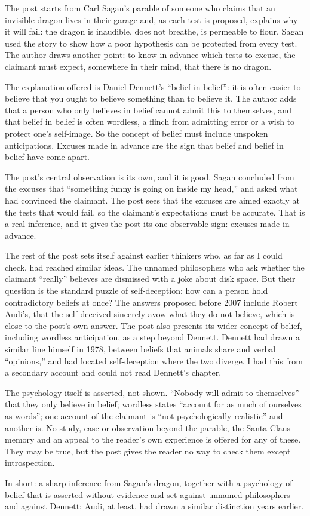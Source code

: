 \begin{afterword}
\summaryhead

The post starts from Carl Sagan's parable of someone who claims that an invisible dragon lives in their garage and, as each test is proposed, explains why it will fail: the dragon is inaudible, does not breathe, is permeable to flour. Sagan used the story to show how a poor hypothesis can be protected from every test. The author draws another point: to know in advance which tests to excuse, the claimant must expect, somewhere in their mind, that there is no dragon.

The explanation offered is Daniel Dennett's ``belief in belief'': it is often easier to believe that you ought to believe something than to believe it. The author adds that a person who only believes in belief cannot admit this to themselves, and that belief in belief is often wordless, a flinch from admitting error or a wish to protect one's self-image. So the concept of belief must include unspoken anticipations. Excuses made in advance are the sign that belief and belief in belief have come apart.

\responsehead

The post's central observation is its own, and it is good. Sagan concluded from the excuses that ``something funny is going on inside my head,'' and asked what had convinced the claimant. The post sees that the excuses are aimed exactly at the tests that would fail, so the claimant's expectations must be accurate. That is a real inference, and it gives the post its one observable sign: excuses made in advance.

The rest of the post sets itself against earlier thinkers who, as far as I could check, had reached similar ideas. The unnamed philosophers who ask whether the claimant ``really'' believes are dismissed with a joke about disk space. But their question is the standard puzzle of self-deception: how can a person hold contradictory beliefs at once? The answers proposed before 2007 include Robert Audi's, that the self-deceived sincerely avow what they do not believe, which is close to the post's own answer. The post also presents its wider concept of belief, including wordless anticipation, as a step beyond Dennett. Dennett had drawn a similar line himself in 1978, between beliefs that animals share and verbal ``opinions,'' and had located self-deception where the two diverge. I had this from a secondary account and could not read Dennett's chapter.

The psychology itself is asserted, not shown. ``Nobody will admit to themselves'' that they only believe in belief; wordless states ``account for as much of ourselves as words''; one account of the claimant is ``not psychologically realistic'' and another is. No study, case or observation beyond the parable, the Santa Claus memory and an appeal to the reader's own experience is offered for any of these. They may be true, but the post gives the reader no way to check them except introspection.

In short: a sharp inference from Sagan's dragon, together with a psychology of belief that is asserted without evidence and set against unnamed philosophers and against Dennett; Audi, at least, had drawn a similar distinction years earlier.
\end{afterword}
